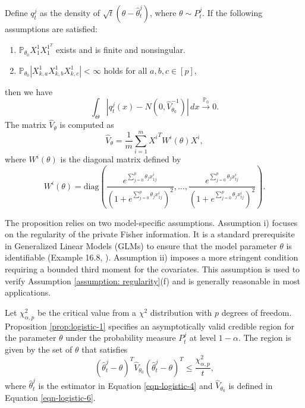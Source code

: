\documentclass[twoside,11pt]{article}
\numberwithin{equation}{section}
\newcommand\bP{\mathbb{P}}
\newcommand{\pto}{\stackrel{\bP_0}{\to}}
\begin{document}
{\begin{proposition}
Define $q_t^j$ as the density of $\sqrt{t}(\theta - \hat{\theta}_t^j)$, where $\theta \sim P_t^j$. If the following assumptions are satisfied:
\begin{enumerate}[label=\roman*)]
    \item $\bP_{\theta_0} X_1^1 X_1^{1^T}$ exists and is finite and nonsingular. 
    \item $\bP_{\theta_0}|X_{k, a}^1 X_{k, b}^1 X_{k, c}^1| < \infty$ holds for all $a, b, c \in [p]$,
\end{enumerate}
then we have
\begin{equation}
\label{eqn-logistic-5}
\int_\Theta \left|q_t^j(x) - N(0, \hat V_{\theta_0}^{-1})\right| \, dx \pto 0.
\end{equation}
The matrix $\hat V_\theta$ is computed as
\begin{equation} \label{eqn-logistic-6}
\hat V_\theta = \frac{1}{m} \sum_{i = 1}^m {X^i}^T W^i(\theta) X^i,
\end{equation}
where $W^i(\theta)$ is the diagonal matrix defined by
\begin{equation*}
W^i(\theta) = \text{diag}\left(
\frac{e^{\sum_{j=0}^{p} \theta_j x_{1j}^i}}{\left(1 + e^{\sum_{j=0}^{p} \theta_j x_{1j}^i}\right)^2},
\ldots,
\frac{e^{\sum_{j=0}^{p} \theta_j x_{tj}^i}}{\left(1 + e^{\sum_{j=0}^{p} \theta_j x_{tj}^i}\right)^2}
\right).
\end{equation*}
\end{proposition}
The proposition relies on two model-specific assumptions. Assumption i) focuses on the regularity of the private Fisher information. It is a standard prerequisite in Generalized Linear Models (GLMs) to ensure that the model parameter $\theta$ is identifiable (Example 16.8, \cite{VanderVaart2000}). Assumption ii) imposes a more stringent condition requiring a bounded third moment for the covariates. This assumption is used to verify Assumption \ref{assumption: regularity}(f) and is generally reasonable in most applications.  

Let $\chi_{\alpha, p}^2$ be the critical value from a $\chi^2$ distribution with $p$ degrees of freedom. Proposition \ref{prop:logistic-1} specifies an asymptotically valid credible region for the parameter $\theta$ under the probability measure $P_t^j$ at level $1 - \alpha$. The region is given by the set of $\theta$ that satisfies
\begin{equation*}
(\hat{\theta}_{t}^j - \theta)^T \hat V_{\theta_0} (\hat{\theta}_{t}^j - \theta)^T \leq \frac{\chi_{\alpha, p}^2}{t}, 
\end{equation*}
where $\hat{\theta}_{t}^j$ is the estimator in Equation \eqref{eqn-logistic-4} and $\hat V_{\theta_0}$ is defined in Equation \eqref{eqn-logistic-6}. 

}
\end{document}
